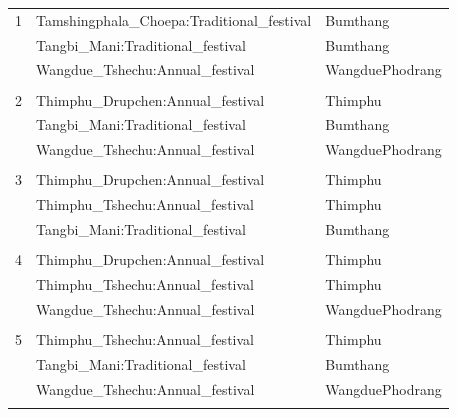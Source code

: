 \documentclass[a4paper,9pt]{beamer}
\begin{document}
{\begin{table} [tbph]
\begin{tabular}{|l|l|l|}
\hline
\rowcolor{yellow}
 1&Tamshingphala\_Choepa:Traditional\_festival& Bumthang\\
 \rowcolor{yellow}
  &Tangbi\_Mani:Traditional\_festival&Bumthang\\
 \rowcolor{yellow}
  &Wangdue\_Tshechu:Annual\_festival&WangduePhodrang\\
  \rowcolor{yellow}
  &                                 &   \\
\hline
 2&Thimphu\_Drupchen:Annual\_festival&Thimphu\\
  &Tangbi\_Mani:Traditional\_festival&Bumthang\\
  &Wangdue\_Tshechu:Annual\_festival&WangduePhodrang\\
  &                                 &   \\
\hline
 3&Thimphu\_Drupchen:Annual\_festival&Thimphu\\
  &Thimphu\_Tshechu:Annual\_festival &Thimphu\\
  &Tangbi\_Mani:Traditional\_festival&Bumthang\\
  &                                 &   \\
\hline
\rowcolor{yellow}
 4&Thimphu\_Drupchen:Annual\_festival&Thimphu\\
\rowcolor{yellow} 
  &Thimphu\_Tshechu:Annual\_festival&Thimphu\\
\rowcolor{yellow}
  &Wangdue\_Tshechu:Annual\_festival&WangduePhodrang\\
\rowcolor{yellow}
  &                                 &   \\
\hline
 5&Thimphu\_Tshechu:Annual\_festival&Thimphu\\
  &Tangbi\_Mani:Traditional\_festival&Bumthang\\
  &Wangdue\_Tshechu:Annual\_festival&WangduePhodrang\\
  &                                 &   \\
\hline
\end{tabular} 
\end{table} 
}
\end{document}
